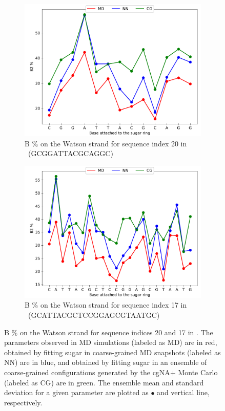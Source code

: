 \begin{figure}[H]
  \begin{subfigure}{15cm}
    \centering\includegraphics[scale=0.8]{images/B1_B2_dihed_stats_20_1.pdf}
    \centering\caption{B \% on the Watson strand for sequence index 20 in \Lbdna \ (GCGGATTACGCAGGC)}
  \end{subfigure} 

  \begin{subfigure}{15cm}
    \centering\includegraphics[scale=0.8]{images/B1_B2_dihed_stats_17_1.pdf}
    \centering\caption{B \% on the Watson strand for sequence index 17 in \Lbdna \ (GCATTACGCTCCGGAGCGTAATGC)}
  \end{subfigure}
\centering\caption{
B \% on the Watson strand for sequence indices 20 and 17 in \Lbdna. 
    The parameters observed in MD simulations (labeled as MD) are in red, obtained by fitting sugar in coarse-grained MD snapshots (labeled as NN) are in blue, and obtained by fitting sugar in an ensemble of coarse-grained configurations generated by the cgNA$+$ Monte Carlo (labeled as CG) are in green. 
    The ensemble mean and standard deviation for a given parameter are plotted as $\bullet$ and vertical line, respectively.
}
\label{c7:fig7}
\end{figure}


